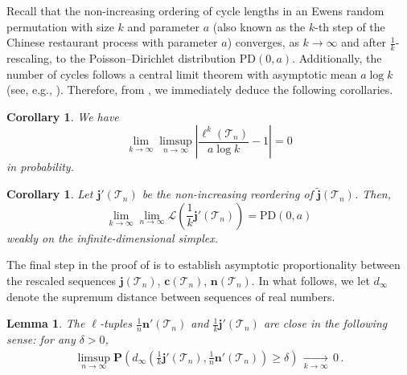 \documentclass{article}
\newtheorem{lemma}[theorem]{Lemma}
\newtheorem{corollary}[theorem]{Corollary}
\theoremstyle{remark}
\newcommand{\cv}[1]{\,\underset{#1}{\longrightarrow}\,}
\newcommand{\abs}[1]{{\left|#1\right|}}
\newcommand{\cT}{\mathcal{T}}
\newcommand{\bc}{\mathbf{c}}
\newcommand{\bj}{\mathbf{j}}
\newcommand{\bn}{\mathbf{n}}
\newcommand{\wbj}{\widetilde{\bj}}
\newcommand{\prob}[1]{\mathbf{P}{\left(#1\right)}}
\newcommand{\Law}[1]{\mathcal{L}{\left(#1\right)}}
\newcommand{\PoissonDirichlet}[2]{\mathrm{PD}{\left(#1,#2\right)}}
\begin{document}
Recall that the non-increasing ordering of cycle lengths in an Ewens random permutation with size $k$ and parameter $a$ (also known as the $k$-th step of the Chinese restaurant process with parameter $a$) converges, as $k\to\infty$ and after $\frac1k$-rescaling, to the Poisson--Dirichlet distribution $\PoissonDirichlet{0}{a}$.
Additionally, the number of cycles follows a central limit theorem with asymptotic mean $a\log k$ (see, e.g., \cite{Arratia_Barbour_Tavare_2003}).
Therefore, from , we immediately deduce the following corollaries.

\begin{corollary}\label{cor: asymptotic concentration ell}
    We have
    \begin{equation*}
        \lim_{k\to\infty} \limsup_{n\to\infty} \abs{ \frac{\ell^k(\cT_n)}{a\log k} - 1 } = 0
    \end{equation*}
    in probability.
\end{corollary}

\begin{corollary}\label{cor: asymptotic distribution tilde j PoissonDirichlet}
    Let $\bj'(\cT_n)$ be the non-increasing reordering of $\wbj(\cT_n)$.
    Then,
    \begin{equation*}
        \lim_{k\to\infty} \lim_{n\to\infty} \Law{ \frac1k \bj'(\cT_n) } = \PoissonDirichlet{0}{a}
    \end{equation*}
    weakly on the infinite-dimensional simplex.
\end{corollary}

The final step in the proof of  is to establish asymptotic proportionality between the rescaled sequences $\bj(\cT_n)$, $\bc(\cT_n)$, $\bn(\cT_n)$.
In what follows, we let $d_\infty$ denote the supremum distance between sequences of real numbers.

\begin{lemma}\label{lem: proportionality tilde j tilde n}
    The $\ell$-tuples $\frac1n \bn'(\cT_n)$ and $\frac1k\bj'(\cT_n)$ are close in the following sense:
    for any $\delta>0$,
    \begin{align*}
    \limsup_{n \rightarrow \infty} \prob{d_\infty{\left( \frac1k \bj'(\cT_n), \frac1n \bn'(\cT_n) \right)}
    \ge \delta} 
    \cv{k\to\infty} 0 \,.
    \end{align*}
\end{lemma}
\end{document}
